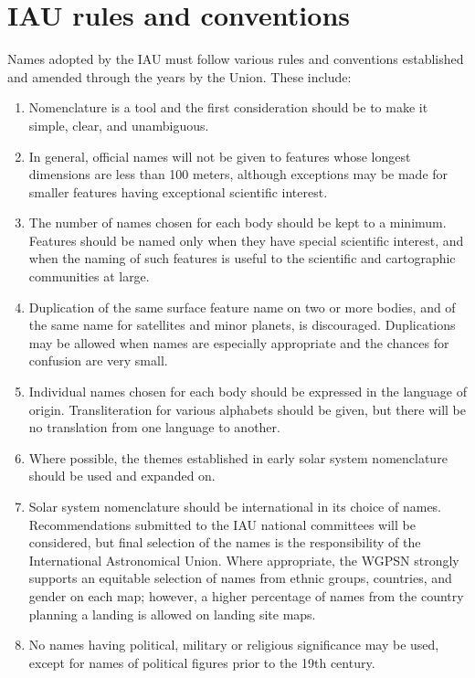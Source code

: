 \section{IAU rules and conventions}
\label{sec:Nomenclature:RulesAndConventions}
Names adopted by the IAU must follow various rules and conventions established and amended through the years by the Union. These include:
\begin{enumerate}
\item Nomenclature is a tool and the first consideration should be to make it simple, clear, and unambiguous.
\item In general, official names will not be given to features whose longest dimensions are less than 100 meters, 
      although exceptions may be made for smaller features having exceptional scientific interest.
\item The number of names chosen for each body should be kept to a minimum. Features should be 
      named only when they have special scientific interest, and when the naming of such features is useful 
	  to the scientific and cartographic communities at large.
\item Duplication of the same surface feature name on two or more bodies, and of the same name for satellites 
      and minor planets, is discouraged. Duplications may be allowed when names are especially appropriate and 
	  the chances for confusion are very small.
\item Individual names chosen for each body should be expressed in the language of origin. 
      Transliteration for various alphabets should be given, but there will be no translation from one language to another.
\item Where possible, the themes established in early solar system nomenclature should be used and expanded on.
\item Solar system nomenclature should be international in its choice of names. 
      Recommendations submitted to the IAU national committees will be considered, but final selection of the names 
	  is the responsibility of the International Astronomical Union. 
	  Where appropriate, the WGPSN strongly supports an equitable selection of names from ethnic groups, 
	  countries, and gender on each map; however, a higher percentage of names from the country planning a 
	  landing is allowed on landing site maps.
\item No names having political, military or religious significance may be used, except for names of political figures prior to the 19th century.

\end{enumerate}
